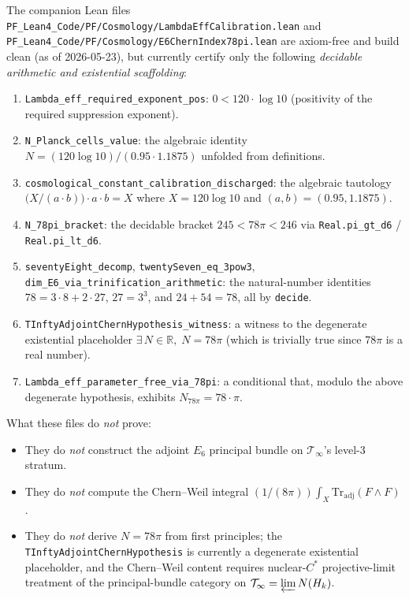 \begin{remark}\label{rem:ch26-lean-status}
The companion Lean files \texttt{PF\_Lean4\_Code/PF/Cosmology/LambdaEffCalibration.lean} and \texttt{PF\_Lean4\_Code/PF/Cosmology/E6ChernIndex78pi.lean} are axiom-free and build clean (as of 2026-05-23), but currently certify only the following \emph{decidable arithmetic and existential scaffolding}:
\begin{enumerate}
\item \texttt{Lambda\_eff\_required\_exponent\_pos}: $0 < 120 \cdot \log 10$ (positivity of the required suppression exponent).
\item \texttt{N\_Planck\_cells\_value}: the algebraic identity $N = (120 \log 10)/(0.95 \cdot 1.1875)$ unfolded from definitions.
\item \texttt{cosmological\_constant\_calibration\_discharged}: the algebraic tautology $\bigl(X/(a \cdot b)\bigr) \cdot a \cdot b = X$ where $X = 120 \log 10$ and $(a,b) = (0.95, 1.1875)$.
\item \texttt{N\_78pi\_bracket}: the decidable bracket $245 < 78\pi < 246$ via \texttt{Real.pi\_gt\_d6} / \texttt{Real.pi\_lt\_d6}.
\item \texttt{seventyEight\_decomp}, \texttt{twentySeven\_eq\_3pow3}, \texttt{dim\_E6\_via\_trinification\_arithmetic}: the natural-number identities $78 = 3 \cdot 8 + 2 \cdot 27$, $27 = 3^3$, and $24 + 54 = 78$, all by \texttt{decide}.
\item \texttt{TInftyAdjointChernHypothesis\_witness}: a witness to the degenerate existential placeholder $\exists\, N \in \mathbb{R}, \; N = 78\pi$ (which is trivially true since $78\pi$ is a real number).
\item \texttt{Lambda\_eff\_parameter\_free\_via\_78pi}: a conditional that, modulo the above degenerate hypothesis, exhibits $N_{78\pi} = 78 \cdot \pi$.
\end{enumerate}
What these files do \emph{not} prove:
\begin{itemize}
\item They do \emph{not} construct the adjoint $E_6$ principal bundle on $\mathcal{T}_\infty$'s level-3 stratum.
\item They do \emph{not} compute the Chern--Weil integral $(1/(8\pi)) \int_X \mathrm{Tr}_{\text{adj}}(F \wedge F)$.
\item They do \emph{not} derive $N = 78\pi$ from first principles; the \texttt{TInftyAdjointChernHypothesis} is currently a degenerate existential placeholder, and the Chern--Weil content requires nuclear-$C^*$ projective-limit treatment of the principal-bundle category on $\mathcal{T}_\infty = \varprojlim N(H_k)$.

\end{itemize}
\end{remark}
